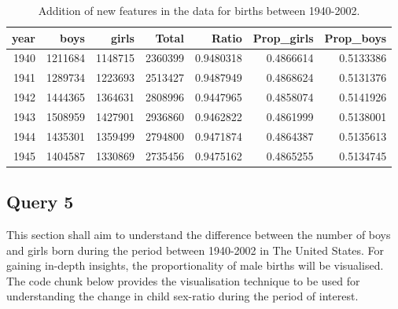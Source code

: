 \documentclass[11pt,a4paper,]{article}
\begin{document}
\begin{table}[H]

\caption{\label{tab:feateng}Addition of new features in the data for births between 1940-2002.}
\centering
\begin{tabular}[t]{r|r|r|r|r|r|r}
\hline
year & boys & girls & Total & Ratio & Prop\_girls & Prop\_boys\\
\hline
1940 & 1211684 & 1148715 & 2360399 & 0.9480318 & 0.4866614 & 0.5133386\\
\hline
1941 & 1289734 & 1223693 & 2513427 & 0.9487949 & 0.4868624 & 0.5131376\\
\hline
1942 & 1444365 & 1364631 & 2808996 & 0.9447965 & 0.4858074 & 0.5141926\\
\hline
1943 & 1508959 & 1427901 & 2936860 & 0.9462822 & 0.4861999 & 0.5138001\\
\hline
1944 & 1435301 & 1359499 & 2794800 & 0.9471874 & 0.4864387 & 0.5135613\\
\hline
1945 & 1404587 & 1330869 & 2735456 & 0.9475162 & 0.4865255 & 0.5134745\\
\hline
\end{tabular}
\end{table}
\normalsize

\hypertarget{query-5}{%
\subsection{Query 5}\label{query-5}}

This section shall aim to understand the difference between the number of boys and girls born during the period between 1940-2002 in The United States. For gaining in-depth insights, the proportionality of male births will be visualised. The code chunk below provides the visualisation technique to be used for understanding the change in child sex-ratio during the period of interest.

\tiny
\end{document}
